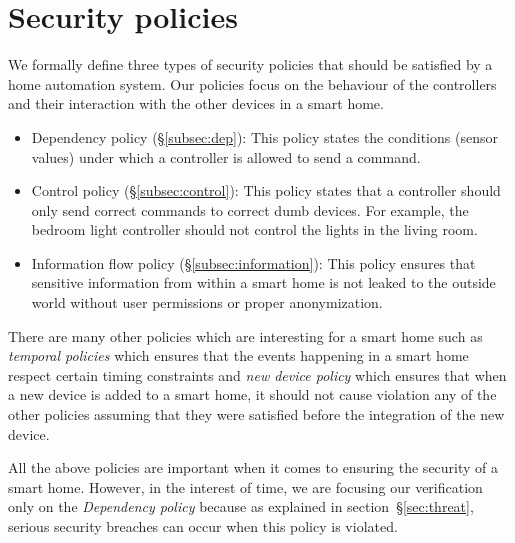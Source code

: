 \documentclass{article}
\begin{document}
\section{Security policies}
\label{sec:policies}
We formally define three types of security policies that should be satisfied by a home automation system. Our policies focus on the behaviour of the controllers and their interaction with the other devices in a smart home. 
\begin{itemize}
\item Dependency policy (\S\ref{subsec:dep}): This policy states the  conditions (sensor values) under which a controller is allowed to send a command.

\item Control policy (\S\ref{subsec:control}): This policy states that a controller should only send correct commands to correct dumb devices. For example, the bedroom light controller should not control the lights in the living room.

\item Information flow policy (\S\ref{subsec:information}): This policy ensures that sensitive information from within a smart home is not leaked to the outside world without user permissions or proper anonymization. 
\end{itemize}
There are many other policies which are interesting for a smart home such as \textit{temporal policies} which ensures that the events happening in a smart home respect certain timing constraints and \textit{new device policy} which ensures that when a new device is added to a smart home, it should not cause violation any of the other policies assuming that they were satisfied before the integration of the new device.

All the above policies are important when it comes to ensuring the security of a smart home. However, in the interest of time, we are focusing our verification only on the \textit{Dependency policy} because as explained in section~\S\ref{sec:threat}, serious security breaches can occur when this policy is violated. 
\end{document}
